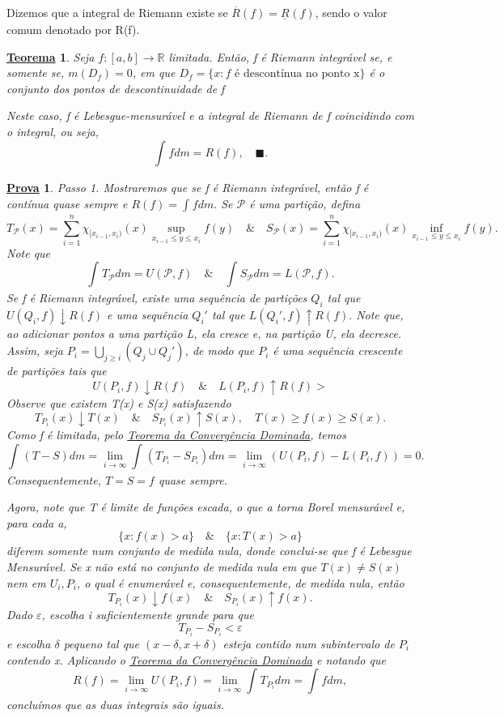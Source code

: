 \documentclass{article}
\newtheorem*{theorem*}{\underline{Teorema}}
\newtheorem*{proof*}{\underline{Prova}}
\renewcommand\qedsymbol{$\blacksquare$}
\begin{document}
  Dizemos que a integral de Riemann existe se \(\overline{R}(f) = \underline{R}_{}(f)\), sendo o valor comum denotado por R(f).
 \begin{theorem*}
   Seja \(f:[a, b]\rightarrow \mathbb{R}\) limitada. Então, f é Riemann integrável se, e somente se, \(m(D_f) = 0\), em que \(D_f = \{x: f \text{ é descontínua no ponto x}\}\) é o conjunto dos pontos 
   de descontinuidade de f 

   Neste caso, f é Lebesgue-mensurável e a integral de Riemann de f coincidindo com o integral, ou seja,
     \[
       \int_{}f dm = R(f),\quad \text{\qedsymbol}.
     \]
 \end{theorem*}
\begin{proof*}
  Passo 1. Mostraremos que se f é Riemann integrável, então f é contínua quase sempre e \(R(f) = \int_{}f dm.\) Se \(\mathcal{P}\) é uma partição, defina 
    \[
      T_{\mathcal{P}}(x) = \sum\limits_{i=1}^{n}\chi_{[x_{i-1}, x_{i})}(x)\sup_{x_{i-1}\leq y\leq x_{i}}f(y) \quad\&\quad S_{\mathcal{P}}(x) = \sum\limits_{i=1}^{n}\chi_{[x_{i-1}, x_{i})}(x)\inf_{x_{i-1}\leq y\leq x_{i}}f(y).
    \]
  Note que 
    \[
      \int_{}T_{\mathcal{P}} dm = U(\mathcal{P}, f) \quad\&\quad \int_{}S_{\mathcal{P}} dm = L(\mathcal{P}, f).
    \]
  Se f é Riemann integrável, existe uma sequência de partições \(Q_{i}\) tal que \(U(Q_{i}, f)\downarrow R(f)\) e uma sequência \(Q_{i}'\) tal que \(L(Q_{i}', f)\uparrow R(f).\) Note que, ao adicionar pontos a uma partição L, ela cresce e, 
  na partição U, ela decresce. Assim, seja \(P_{i} = \bigcup_{j\geq i}^{}(Q_{j}\cup Q_{j}')\), de modo que \(P_{i}\) é uma sequência crescente de partições tais que 
    \[
      U(P_{i}, f)\downarrow R(f)\quad\&\quad L(P_{i}, f)\uparrow R(f)>
    \]
  Observe que existem T(x) e S(x) satisfazendo 
    \[
      T_{P_{i}}(x)\downarrow T(x) \quad\&\quad S_{P_{i}}(x)\uparrow S(x),\quad T(x)\geq f(x)\geq S(x).
    \]
  Como f é limitada, pelo \hyperlink{dominated_convergence}{Teorema da Convergência Dominada}, temos 
    \[
      \int_{}(T-S) dm = \lim_{i\to \infty}\int_{}(T_{P_{i}} - S_{P_{i}}) dm = \lim_{i\to \infty}(U(P_{i}, f) - L(P_{i}, f)) = 0.
    \]
  Consequentemente, \(T = S = f\) quase sempre. 

  Agora, note que T é limite de funções escada, o que a torna Borel mensurável e, para cada a, 
    \[
      \{x:f(x)>a\}\quad\&\quad \{x:T(x)>a\}
    \]
  diferem somente num conjunto de medida nula, donde conclui-se que f é Lebesgue Mensurável. Se x não está no conjunto de medida nula em que \(T(x)\neq S(x)\) nem em \(U_{i}, P_{i}\), 
o qual é enumerável e, consequentemente, de medida nula, então 
  \[
    T_{P_{i}}(x)\downarrow f(x) \quad\&\quad S_{P_{i}}(x)\uparrow f(x).
  \]
  Dado \(\varepsilon \), escolha i suficientemente grande para que 
    \[
      T_{P_{i}} - S_{P_{i}} < \varepsilon 
    \]
  e escolha \(\delta \) pequeno tal que \((x-\delta , x+\delta )\) esteja contido num subintervalo de \(P_{i}\) contendo x. Aplicando o \hyperlink{dominated_convergence}{Teorema da Convergência Dominada} e notando que 
    \[
      R(f) = \lim_{i\to \infty}U(P_{i}, f) = \lim_{i\to \infty}\int_{}T_{P_{i}} dm = \int_{}f dm,
    \]
  concluímos que as duas integrais são iguais.


\end{proof*}
\end{document}
